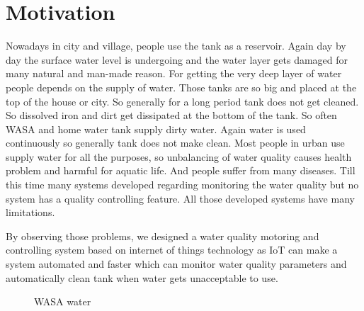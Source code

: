 \section{Motivation}
Nowadays in city and village, people use the tank as a reservoir. Again day by day the surface water level is undergoing and the water layer gets damaged for many natural and man-made reason. For getting the very deep layer of water people depends on the supply of water. Those tanks are so big and placed at the top of the house or city. So generally for a long period tank does not get cleaned. So dissolved iron and dirt get dissipated at the bottom of the tank. So often WASA and home water tank supply dirty water. Again water is used continuously so generally tank does not make clean. Most people in urban use supply water for all the purposes, so unbalancing of water quality causes health problem and harmful for aquatic life. And people suffer from many diseases. Till this time many systems developed regarding monitoring the water quality but no system has a quality controlling feature. All those developed systems have many limitations. 

By observing those problems, we designed a water quality motoring and controlling system based on internet of things technology as IoT can make a system automated and faster \cite{gubbi2013internet} which can monitor water quality parameters and automatically clean tank when water gets unacceptable to use.

\vspace{1cm}


\begin{figure}[h]
\centering
{} 
\hspace{1in}

\caption{WASA water}
\end{figure}

